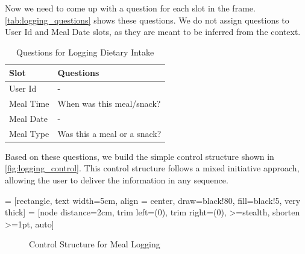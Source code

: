 Now we need to come up with a question for each slot in the frame.
\autoref{tab:logging_questions} shows these questions.
We do not assign questions to User Id and Meal Date slots, as they are meant to be inferred from the context.

\begin{table}[htbp]
  \caption[Question for Logging Dietary Intake]{Questions for Logging Dietary Intake}\label{tab:logging_questions}
  \centering
  \begin{tabular}{l|l}
    Slot&Questions\\ \toprule
    User Id&-\\ \hline
    Meal Time&When was this meal/snack?\\ \hline
    Meal Date&-\\ \hline
    Meal Type&Was this a meal or a snack?\\ \hline
  \end{tabular}
\end{table}

Based on these questions, we build the simple control structure shown in \autoref{fig:logging_control}.
This control structure follows a mixed initiative approach, 
allowing the user to deliver the information in any sequence.

\usetikzlibrary{automata,positioning}
 = [rectangle,
                    text width=5cm,
                    align = center,
                    draw=black!80,
                    fill=black!5,
                    very thick]
 = [node distance=2cm,
                      trim left=(0),
                      trim right=(0),
                      >=stealth,
                      shorten >=1pt,
                      auto]
\begin{figure}[htbp]
  \centering
  \caption[Control Structure for Meal Logging]{Control Structure for Meal Logging}\label{fig:logging_control}
\end{figure}


